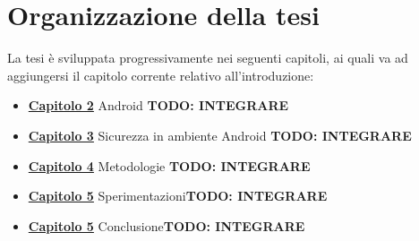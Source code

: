 
\section{Organizzazione della tesi}
\label{sec:intro4}
La tesi è sviluppata progressivamente nei seguenti capitoli, ai quali va ad aggiungersi il capitolo corrente relativo all'introduzione:


\begin{itemize}
    \item\hyperref[chap:cap2]{\textbf{Capitolo 2}} Android \textbf{TODO: INTEGRARE}
    \item\hyperref[chap:cap3]{\textbf{Capitolo 3}} Sicurezza in ambiente Android \textbf{TODO: INTEGRARE}
    \item\hyperref[chap:cap4]{\textbf{Capitolo 4}} Metodologie \textbf{TODO: INTEGRARE}
    \item\hyperref[chap:cap5]{\textbf{Capitolo 5}} Sperimentazioni\textbf{TODO: INTEGRARE}
    \item\hyperref[chap:conclusioni]{\textbf{Capitolo 5}} Conclusione\textbf{TODO: INTEGRARE}
\end{itemize}


